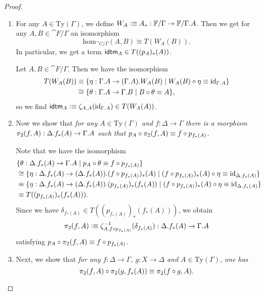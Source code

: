\begin{proof}
\begin{enumerate}
\item
For any $A\in\mathrm{Ty}(\Gamma)$, we define
$W_A\defeq A_\ast:\cat{F}/\Gamma\to\cat{F}/\ctxext{\Gamma}{A}$. Then we get
for any $A,B\in\cat{F}/\Gamma$ an isomorphism
\begin{equation*}
\mathrm{hom}_{\cat{C}/\Gamma}(A,B)
  \cong
T(W_A(B)).
\end{equation*}
In particular, we get a term $\idtm{A}\in T((p_A)_\ast(A))$. 
\medskip

Let $A,B\in\cat{F}/\Gamma$. Then we have the isomorphism
\begin{align*}
T(W_A(B)) & \jdeq \{\eta:\ctxext{\Gamma}{A}\to\ctxext{{\Gamma}{A}}{W_A(B)}\mid W_A(B)\circ\eta\jdeq\catid{\ctxext{\Gamma}{A}}\} \\
  & \cong
\{\theta:\ctxext{\Gamma}{A}\to\ctxext{\Gamma}{B}\mid B\circ\theta\jdeq A\},
\end{align*}
so we find $\idtm{A}\defeq\zeta_{A,A}(\catid{\ctxext{\Gamma}{A}})\in T(W_A(A))$.

\item Now we show that 
\begingroup\it for any $A\in\mathrm{Ty}(\Gamma)$ and $f:\Delta\to\Gamma$ 
there is a morphism $\pi_2(f,A):\ctxext{\Delta}{f_\ast(A)}\to\ctxext{\Gamma}{A}$
such that $p_A\circ \pi_2(f,A)\equiv f\circ p_{f_\ast(A)}$.
\endgroup
\medskip

Note that we have the isomorphism
\begin{align*}
& \{ \theta : \ctxext{\Delta}{f_\ast(A)}\to\ctxext{\Gamma}{A}\mid p_A\circ\theta\jdeq f\circ p_{f_\ast(A)} \} \\
  & \cong
\{ \eta : \ctxext{\Delta}{f_\ast(A)}\to\ctxext{{\Delta}{f_\ast(A)}}{(f\circ p_{f_\ast(A)})_\ast(A)}
  \mid (f\circ p_{f_\ast(A)})_\ast(A)\circ\eta\jdeq\catid{\ctxext{\Delta}{f_\ast(A)}}\} \\
  & \jdeq
\{ \eta : \ctxext{\Delta}{f_\ast(A)}\to\ctxext{{\Delta}{f_\ast(A)}}{(p_{f_\ast(A)})_\ast(f_\ast(A))}
  \mid (f\circ p_{f_\ast(A)})_\ast(A)\circ\eta\jdeq\catid{\ctxext{\Delta}{f_\ast(A)}}\} \\
  & \jdeq
T((p_{f_\ast(A)})_\ast(f_\ast(A))).
\end{align*}
Since we have $\delta_{f_\ast(A)}\in T((p_{f_\ast(A)})_\ast(f_\ast(A)))$, we obtain 
\begin{equation*}
\pi_2(f,A)\defeq \zeta_{A,f\circ p_{f_\ast(A)}}^{-1}(\delta_{f_\ast(A)}):\ctxext{\Delta}{f_\ast(A)}\to\ctxext{\Gamma}{A}
\end{equation*}
satisfying $p_A\circ\pi_2(f,A)\equiv f\circ p_{f_\ast(A)}$.
\item Next, we show that
\begingroup\it
for any $f:\Delta\to\Gamma$, $g:X\to\Delta$ and $A\in\mathrm{Ty}(\Gamma)$, one has
\begin{equation*}
\pi_2(f,A)\circ\pi_2(g,f_\ast(A))\equiv\pi_2(f\circ g,A).
\end{equation*}
\endgroup
\medskip


\end{enumerate}
\end{proof}

